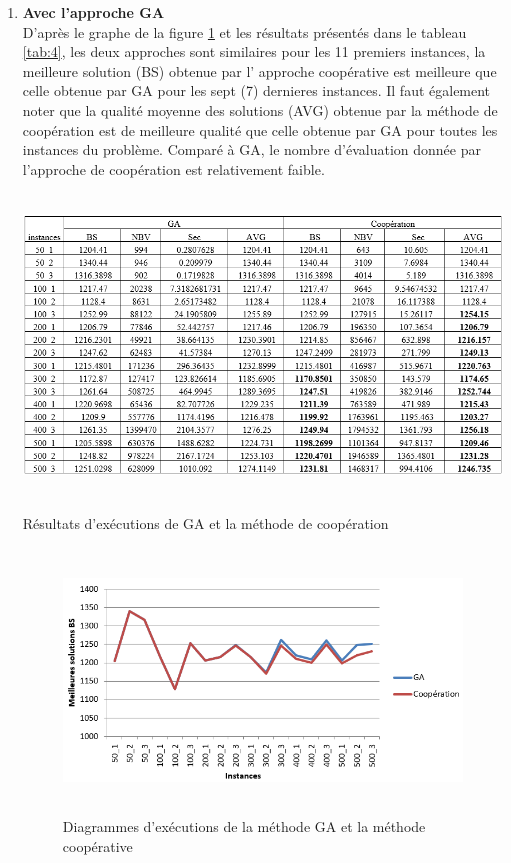 \begin{enumerate}[label=\alph*)]
	\item \textbf{Avec l’approche GA}\\	
D’après le graphe de la figure \ref{fig:DEMGAMC} et les résultats présentés dans le tableau \ref{tab:4}, les deux approches sont similaires pour les 11 premiers instances, la meilleure solution (BS) obtenue par l’ approche coopérative  est meilleure que celle obtenue par GA pour les sept  (7) dernieres instances. Il faut également noter que la qualité moyenne des solutions (AVG) obtenue par la méthode de coopération est de meilleure qualité que celle obtenue par GA pour toutes les instances du problème. Comparé à GA, le nombre d’évaluation donnée par  l’approche de coopération est relativement faible.

\begin{table}[H]
	\includegraphics[width=15cm,height=8cm]{Chap5/t4.png}
	\caption{Résultats d’exécutions de GA et la méthode de coopération}
	\label{tab:4}
\end{table}

\begin{figure}[H]
	\centering
	\includegraphics[width=16cm,height=7cm]{Chap5/4.png}
	\caption{Diagrammes d’exécutions de la méthode GA et la méthode coopérative}
	\label{fig:DEMGAMC}
\end{figure}


\end{enumerate}



